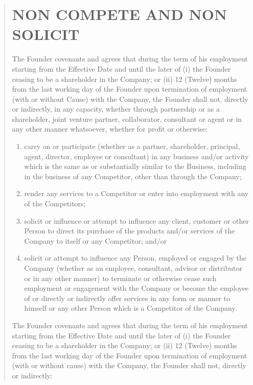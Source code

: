 \documentclass[
]{article}
\begin{document}
\begin{quote}
\section{NON COMPETE AND NON SOLICIT}

 The Founder covenants and agrees that during the term of his employment
starting from the Effective Date and until the later of (i) the Founder
ceasing to be a shareholder in the Company; or (ii) 12 (Twelve) months
from the last working day of the Founder upon termination of employment
(with or without Cause) with the Company, the Founder shall not, directly
or indirectly, in any capacity, whether through partnership or as a
shareholder, joint venture partner, collaborator, consultant or agent or
in any other manner whatsoever, whether for profit or otherwise:

\begin{enumerate}[label=\alph*).]
  \item carry on or participate (whether as a partner, shareholder,
        principal, agent, director, employee or consultant) in any business
        and/or activity which is the same as or substantially similar to the
        Business, including in the business of any Competitor, other than
        through the Company;
  \item render any services to a Competitor or enter into employment with
        any of the Competitors;
  \item solicit or influence or attempt to influence any client, customer
        or other Person to direct its purchase of the products and/or
        services of the Company to itself or any Competitor; and/or
  \item solicit or attempt to influence any Person, employed or engaged
        by the Company (whether as an employee, consultant, advisor or
        distributor or in any other manner) to terminate or otherwise cease
        such employment or engagement with the Company or become the
        employee of or directly or indirectly offer services in any form
        or manner to himself or any other Person which is a Competitor of
        the Company.
\end{enumerate}

 The Founder covenants and agrees that during the term of his
employment starting from the Effective Date and until the later of (i)
the Founder ceasing to be a shareholder in the Company; or (ii) 12
(Twelve) months from the last working day of the Founder upon
termination of employment (with or without cause) with the Company, the
Founder shall not, directly or indirectly:


\end{quote}
\end{document}

